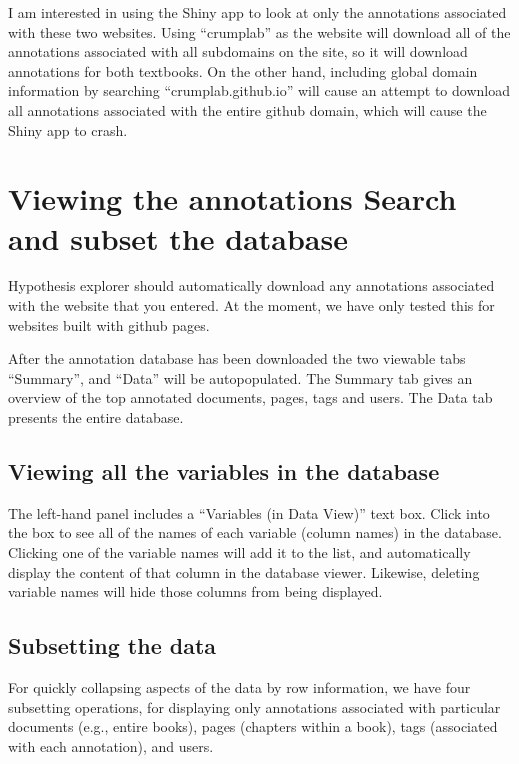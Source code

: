 \documentclass[]{book}
\begin{document}
I am interested in using the Shiny app to look at only the annotations
associated with these two websites. Using ``crumplab'' as the website
will download all of the annotations associated with all subdomains on
the site, so it will download annotations for both textbooks. On the
other hand, including global domain information by searching
``crumplab.github.io'' will cause an attempt to download all annotations
associated with the entire github domain, which will cause the Shiny app
to crash.

\section{Viewing the annotations Search and subset the
database}\label{viewing-the-annotations-search-and-subset-the-database}

Hypothesis explorer should automatically download any annotations
associated with the website that you entered. At the moment, we have
only tested this for websites built with github pages.

After the annotation database has been downloaded the two viewable tabs
``Summary'', and ``Data'' will be autopopulated. The Summary tab gives
an overview of the top annotated documents, pages, tags and users. The
Data tab presents the entire database.

\subsection{Viewing all the variables in the
database}\label{viewing-all-the-variables-in-the-database}

The left-hand panel includes a ``Variables (in Data View)'' text box.
Click into the box to see all of the names of each variable (column
names) in the database. Clicking one of the variable names will add it
to the list, and automatically display the content of that column in the
database viewer. Likewise, deleting variable names will hide those
columns from being displayed.

\subsection{Subsetting the data}\label{subsetting-the-data}

For quickly collapsing aspects of the data by row information, we have
four subsetting operations, for displaying only annotations associated
with particular documents (e.g., entire books), pages (chapters within a
book), tags (associated with each annotation), and users.
\end{document}
